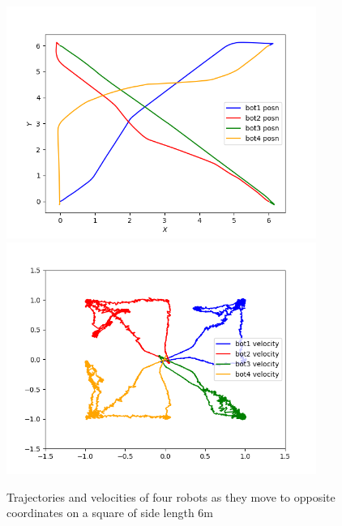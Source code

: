 \documentclass[12pt]{report}
\begin{document}
\renewcommand{\thefigure}{8}
\begin{figure}[h]
	\centering
	\includegraphics[width=0.9\textwidth]{4bot_pos.png}
	\includegraphics[width=0.9\textwidth]{4bot_vel.png}
	\caption{Trajectories and velocities of four robots as they move to opposite coordinates on a square of side length 6m}  \label{fig:4bot}
\end{figure}
\end{document}
